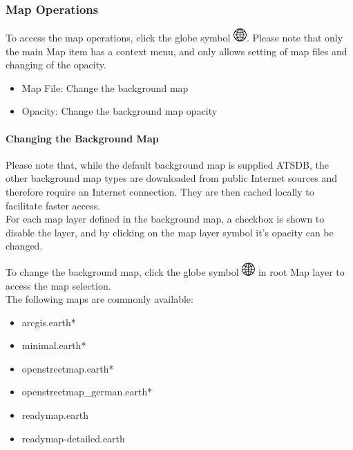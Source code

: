 \subsubsection{Map Operations}
\label{ref:osgview_map_ops}

To access the map operations, click the globe symbol \includegraphics[width=0.5cm,frame]{../../data/icons/globe.png}. Please note that only the main Map item has a context menu, and only allows setting of map files and changing of the opacity.

\begin{itemize}
 \item Map File: Change the background map
 \item Opacity: Change the background map opacity
\end{itemize} 

\paragraph{Changing the Background Map}

Please note that, while the default background map is supplied ATSDB, the other background map types are downloaded from public Internet sources and therefore require an Internet connection. They are then cached locally to facilitate faster access. \\

For each map layer defined in the background map, a checkbox is shown to disable the layer, and by clicking on the map layer symbol it's opacity can be changed.

To change the background map, click the globe symbol \includegraphics[width=0.5cm,frame]{../../data/icons/globe.png} in root Map layer to access the map selection. \\

The following maps are commonly available:

\begin{itemize}
 \item arcgis.earth*
 \item minimal.earth*
 \item openstreetmap.earth*
 \item openstreetmap\_german.earth*
 \item readymap.earth
 \item readymap-detailed.earth
\end{itemize}
 \ \\
 
